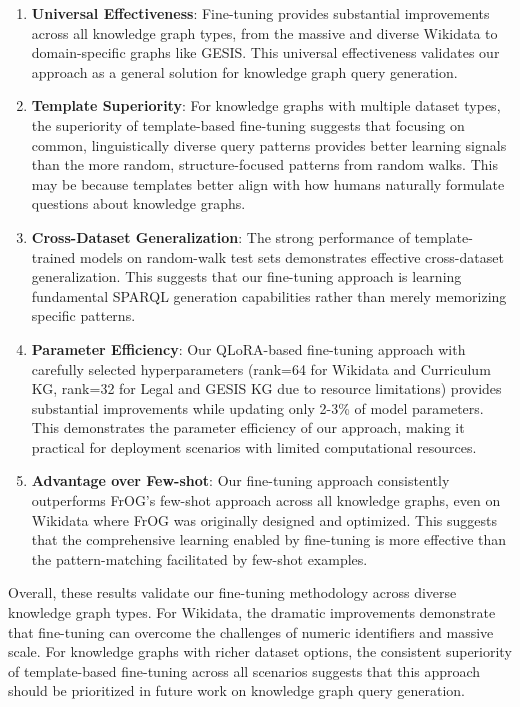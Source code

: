 \begin{enumerate}
    \item \textbf{Universal Effectiveness}: Fine-tuning provides substantial improvements across all knowledge graph types, from the massive and diverse Wikidata to domain-specific graphs like GESIS. This universal effectiveness validates our approach as a general solution for knowledge graph query generation.
    
    \item \textbf{Template Superiority}: For knowledge graphs with multiple dataset types, the superiority of template-based fine-tuning suggests that focusing on common, linguistically diverse query patterns provides better learning signals than the more random, structure-focused patterns from random walks. This may be because templates better align with how humans naturally formulate questions about knowledge graphs.
    
    \item \textbf{Cross-Dataset Generalization}: The strong performance of template-trained models on random-walk test sets demonstrates effective cross-dataset generalization. This suggests that our fine-tuning approach is learning fundamental SPARQL generation capabilities rather than merely memorizing specific patterns.
    
    \item \textbf{Parameter Efficiency}: Our QLoRA-based fine-tuning approach with carefully selected hyperparameters (rank=64 for Wikidata and Curriculum KG, rank=32 for Legal and GESIS KG due to resource limitations) provides substantial improvements while updating only 2-3\% of model parameters. This demonstrates the parameter efficiency of our approach, making it practical for deployment scenarios with limited computational resources.
        
    \item \textbf{Advantage over Few-shot}: Our fine-tuning approach consistently outperforms FrOG's few-shot approach across all knowledge graphs, even on Wikidata where FrOG was originally designed and optimized. This suggests that the comprehensive learning enabled by fine-tuning is more effective than the pattern-matching facilitated by few-shot examples.
\end{enumerate}

Overall, these results validate our fine-tuning methodology across diverse knowledge graph types. For Wikidata, the dramatic improvements demonstrate that fine-tuning can overcome the challenges of numeric identifiers and massive scale. For knowledge graphs with richer dataset options, the consistent superiority of template-based fine-tuning across all scenarios suggests that this approach should be prioritized in future work on knowledge graph query generation.

